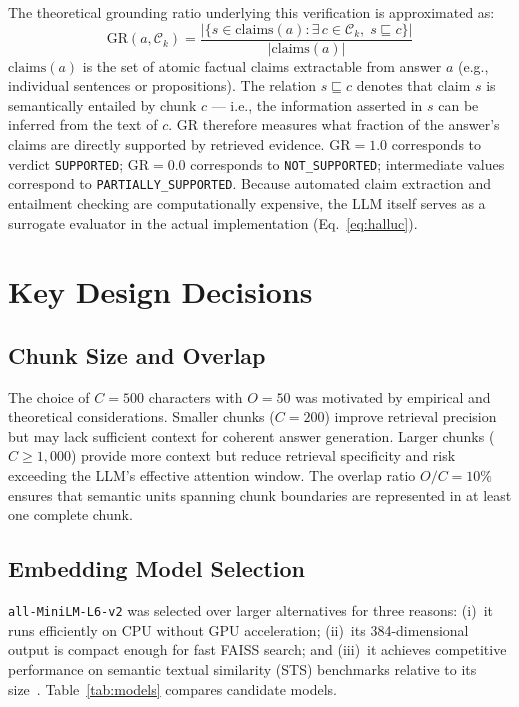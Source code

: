 \documentclass[conference]{IEEEtran}
\begin{document}
The theoretical grounding ratio underlying this verification is
approximated as:
\begin{equation}
  \mathrm{GR}(a,\mathcal{C}_k) =
  \frac{\bigl|\{s \in \mathrm{claims}(a) :
        \exists\, c \in \mathcal{C}_k,\; s \sqsubseteq c\}\bigr|}
       {|\mathrm{claims}(a)|}
  \label{eq:gr}
\end{equation}
$\mathrm{claims}(a)$ is the set of atomic factual claims extractable
from answer $a$ (e.g., individual sentences or propositions).
The relation $s \sqsubseteq c$ denotes that claim $s$ is semantically
entailed by chunk $c$ --- i.e., the information asserted in $s$ can be
inferred from the text of $c$.
$\mathrm{GR}$ therefore measures what fraction of the answer's claims
are directly supported by retrieved evidence.
$\mathrm{GR}=1.0$ corresponds to verdict \texttt{SUPPORTED};
$\mathrm{GR}=0.0$ corresponds to \texttt{NOT\_SUPPORTED};
intermediate values correspond to \texttt{PARTIALLY\_SUPPORTED}.
Because automated claim extraction and entailment checking are
computationally expensive, the LLM itself serves as a surrogate
evaluator in the actual implementation (Eq.~\eqref{eq:halluc}).

\section{Key Design Decisions}
\label{sec:design}

\subsection{Chunk Size and Overlap}
The choice of $C=500$ characters with $O=50$ was motivated by empirical
and theoretical considerations.
Smaller chunks ($C=200$) improve retrieval precision but may lack
sufficient context for coherent answer generation.
Larger chunks ($C\geq1{,}000$) provide more context but reduce retrieval
specificity and risk exceeding the LLM's effective attention window.
The overlap ratio $O/C=10\%$ ensures that semantic units spanning chunk
boundaries are represented in at least one complete chunk.

\subsection{Embedding Model Selection}
\texttt{all-MiniLM-L6-v2} was selected over larger alternatives for
three reasons: (i)~it runs efficiently on CPU without GPU acceleration;
(ii)~its 384-dimensional output is compact enough for fast FAISS search;
and (iii)~it achieves competitive performance on semantic textual
similarity (STS) benchmarks relative to its size~\cite{reimers2019sbert}.
Table~\ref{tab:models} compares candidate models.
\end{document}
